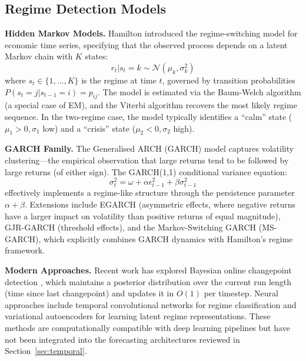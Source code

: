 \documentclass[conference]{IEEEtran}
\begin{document}
\subsection{Regime Detection Models}

\textbf{Hidden Markov Models.} Hamilton \cite{hamilton1989new} introduced the regime-switching model for economic time series, specifying that the observed process depends on a latent Markov chain with $K$ states:
\begin{equation}
r_t | s_t = k \sim \mathcal{N}(\mu_k, \sigma_k^2)
\end{equation}
where $s_t \in \{1, \ldots, K\}$ is the regime at time $t$, governed by transition probabilities $P(s_t = j | s_{t-1} = i) = p_{ij}$. The model is estimated via the Baum-Welch algorithm (a special case of EM), and the Viterbi algorithm recovers the most likely regime sequence. In the two-regime case, the model typically identifies a ``calm'' state ($\mu_1 > 0, \sigma_1$ low) and a ``crisis'' state ($\mu_2 < 0, \sigma_2$ high).

\textbf{GARCH Family.} The Generalised ARCH (GARCH) model \cite{bollerslev1986generalized} captures volatility clustering---the empirical observation that large returns tend to be followed by large returns (of either sign). The GARCH(1,1) conditional variance equation:
\begin{equation}
\sigma_t^2 = \omega + \alpha \epsilon_{t-1}^2 + \beta \sigma_{t-1}^2
\end{equation}
effectively implements a regime-like structure through the persistence parameter $\alpha + \beta$. Extensions include EGARCH (asymmetric effects, where negative returns have a larger impact on volatility than positive returns of equal magnitude), GJR-GARCH (threshold effects), and the Markov-Switching GARCH (MS-GARCH), which explicitly combines GARCH dynamics with Hamilton's regime framework.

\textbf{Modern Approaches.} Recent work has explored Bayesian online changepoint detection \cite{adams2007bayesian}, which maintains a posterior distribution over the current run length (time since last changepoint) and updates it in $O(1)$ per timestep. Neural approaches include temporal convolutional networks for regime classification and variational autoencoders for learning latent regime representations. These methods are computationally compatible with deep learning pipelines but have not been integrated into the forecasting architectures reviewed in Section~\ref{sec:temporal}.
\end{document}
